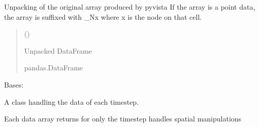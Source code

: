 \documentclass[letterpaper,10pt,english]{sphinxmanual}
\begin{document}
\begin{fulllineitems}
\begin{fulllineitems}
\begin{quote}
\begin{description}
\end{description}\end{quote}

\end{fulllineitems}


\begin{fulllineitems}
\label{\detokenize{pyfdempp:pyfdempp.pyfdempp.Model.unpack_DataFrame}}
\pysigstartsignatures
{}
\pysigstopsignatures
\sphinxAtStartPar
Unpacking of the original array produced by pyvista
If the array is a point data, the array is suffixed with \_Nx where x is the node on that cell.
\begin{quote}\begin{description}
\sphinxAtStartPar
{} () \textendash{} 

\sphinxAtStartPar
Unpacked DataFrame

\sphinxAtStartPar
pandas.DataFrame

\end{description}\end{quote}

\end{fulllineitems}


\end{fulllineitems}


\begin{fulllineitems}
\label{\detokenize{pyfdempp:pyfdempp.pyfdempp.Timestep}}
\pysigstartsignatures
{}
\pysigstopsignatures
\sphinxAtStartPar
Bases: 

\sphinxAtStartPar
A class handling the data of each timestep.

\sphinxAtStartPar
Each data array returns for only the timestep
handles spatial manipulations

\end{fulllineitems}
\end{document}
